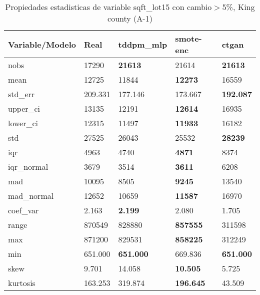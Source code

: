 \begin{table}[H]
\centering
\fontsize{8}{14}\selectfont
\caption{Propiedades estadisticas de variable sqft\_lot15 con cambio\ensuremath{>}5\%, King county (A-1)}
\label{table-stats-king county-a-1-sqft_lot15-short}
\begin{tabular}{|l|m{10em}|m{10em}|m{10em}|m{10em}|}
\hline
 \rowcolor[gray]{0.8}
Variable/Modelo & Real & tddpm\_mlp & smote-enc & ctgan \\
\hline nobs & 17290 & \bfseries 21613 & \cellcolor[rgb]{0.9, 0.54, 0.52} 21614 & \bfseries 21613 \\
\hline mean & 12725 & 11844 & \bfseries 12273 & \cellcolor[rgb]{0.9, 0.54, 0.52} 16559 \\
\hline std\_err & 209.331 & 177.146 & \cellcolor[rgb]{0.9, 0.54, 0.52} 173.667 & \bfseries 192.087 \\
\hline upper\_ci & 13135 & 12191 & \bfseries 12614 & \cellcolor[rgb]{0.9, 0.54, 0.52} 16935 \\
\hline lower\_ci & 12315 & 11497 & \bfseries 11933 & \cellcolor[rgb]{0.9, 0.54, 0.52} 16182 \\
\hline std & 27525 & 26043 & \cellcolor[rgb]{0.9, 0.54, 0.52} 25532 & \bfseries 28239 \\
\hline iqr & 4963 & 4740 & \bfseries 4871 & \cellcolor[rgb]{0.9, 0.54, 0.52} 8374 \\
\hline iqr\_normal & 3679 & 3514 & \bfseries 3611 & \cellcolor[rgb]{0.9, 0.54, 0.52} 6208 \\
\hline mad & 10095 & 8505 & \bfseries 9245 & \cellcolor[rgb]{0.9, 0.54, 0.52} 13540 \\
\hline mad\_normal & 12652 & 10659 & \bfseries 11587 & \cellcolor[rgb]{0.9, 0.54, 0.52} 16970 \\
\hline coef\_var & 2.163 & \bfseries 2.199 & 2.080 & \cellcolor[rgb]{0.9, 0.54, 0.52} 1.705 \\
\hline range & 870549 & 828880 & \bfseries 857555 & \cellcolor[rgb]{0.9, 0.54, 0.52} 311598 \\
\hline max & 871200 & 829531 & \bfseries 858225 & \cellcolor[rgb]{0.9, 0.54, 0.52} 312249 \\
\hline min & 651.000 & \bfseries 651.000 & \cellcolor[rgb]{0.9, 0.54, 0.52} 669.836 & \bfseries 651.000 \\
\hline skew & 9.701 & \cellcolor[rgb]{0.9, 0.54, 0.52} 14.058 & \bfseries 10.505 & 5.725 \\
\hline kurtosis & 163.253 & \cellcolor[rgb]{0.9, 0.54, 0.52} 319.874 & \bfseries 196.645 & 43.509 \\

\end{tabular}
\end{table}
